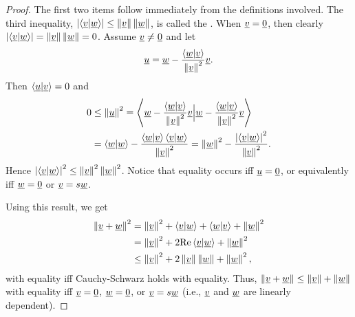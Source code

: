 \begin{proof}
The first two items follow immediately from the definitions involved.
The third inequality, $\left| \left\langle \underline{v} | \underline{w} \right\rangle \right| \leq \left\| \underline{v} \right\| \left\| \underline{w} \right\|$, is called the .
When $\underline{v} = \underline{0}$, then clearly $\left| \left\langle \underline{v} | \underline{w} \right\rangle \right| = \left\| \underline{v} \right\| \left\| \underline{w} \right\| =0$.
Assume $\underline{v} \neq \underline{0}$ and let
\begin{equation*}
\underline{u} = \underline{w} - \frac{ \left\langle \underline{w} | \underline{v} \right\rangle}{ \left\| \underline{v} \right\|^2 } \underline{v}.
\end{equation*}
Then $\left\langle \underline{u} | \underline{v} \right\rangle = 0$ and
\begin{equation*}
\begin{split}
0 &\leq \left\| \underline{u} \right\|^2
= \left\langle \underline{w} - \frac{ \left\langle \underline{w} | \underline{v} \right\rangle}{ \left\| \underline{v} \right\|^2 } \underline{v} \Big|
\underline{w} - \frac{ \left\langle \underline{w} | \underline{v} \right\rangle}{ \left\| \underline{v} \right\|^2 } \underline{v} \right\rangle \\
&= \left\langle \underline{w} | \underline{w} \right\rangle
- \frac{ \left\langle \underline{w} | \underline{v} \right\rangle
\left\langle \underline{v} | \underline{w} \right\rangle }
{ \left\| \underline{v} \right\|^2 }
= \left\| \underline{w} \right\|^2
- \frac{ \left| \left\langle \underline{v} | \underline{w} \right\rangle \right|^2 }
{ \left\| \underline{v} \right\|^2 } .
\end{split}
\end{equation*}
Hence
$\left| \left\langle \underline{v} | \underline{w} \right\rangle \right|^2 \leq \left\| \underline{v} \right\|^2 \left\| \underline{w} \right\|^2$.
Notice that equality occurs iff $\underline{u}=\underline{0}$, or equivalently iff $\underline{w}=\underline{0}$ or $\underline{v} = s \underline{w}$.

Using this result, we get
\begin{equation*}
\begin{split}
\left\| \underline{v} + \underline{w} \right\|^2
&= \left\| \underline{v} \right\|^2 + \left\langle \underline{v} | \underline{w} \right\rangle + \left\langle \underline{w} | \underline{v} \right\rangle + \left\| \underline{w} \right\|^2 \\
&= \left\| \underline{v} \right\|^2 + 2 \mathrm{Re} \left\langle \underline{v} | \underline{w} \right\rangle + \left\| \underline{w} \right\|^2 \\
&\leq \left\| \underline{v} \right\|^2 + 2 \left\| \underline{v} \right\| \left\| \underline{w} \right\| + \left\| \underline{w} \right\|^2 ,
\end{split}
\end{equation*}
with equality iff Cauchy-Schwarz holds with equality.
Thus, $\left\| \underline{v} + \underline{w} \right\| \leq \left\| \underline{v} \right\| + \left\| \underline{w} \right\|$ with equality iff $\underline{v} = \underline{0}$, $\underline{w}=\underline{0}$, or $\underline{v} = s \underline{w}$ (i.e., $\underline{v}$ and $\underline{w}$ are linearly dependent).
\end{proof}

